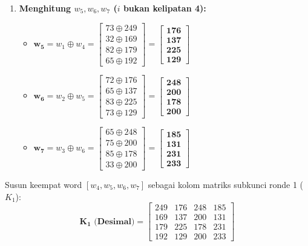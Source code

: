 \documentclass[11pt,a4paper]{article}
\begin{document}
\begin{enumerate}[leftmargin=*]
    \item \textbf{Menghitung $w_5, w_6, w_7$ ($i$ bukan kelipatan 4):}
    \begin{itemize}
        \item $\mathbf{w_5} = w_1 \oplus w_4 = \begin{bmatrix} 73 \oplus 249 \\ 32 \oplus 169 \\ 82 \oplus 179 \\ 65 \oplus 192 \end{bmatrix} = \mathbf{\begin{bmatrix} 176 \\ 137 \\ 225 \\ 129 \end{bmatrix}}$
        \item $\mathbf{w_6} = w_2 \oplus w_5 = \begin{bmatrix} 72 \oplus 176 \\ 65 \oplus 137 \\ 83 \oplus 225 \\ 73 \oplus 129 \end{bmatrix} = \mathbf{\begin{bmatrix} 248 \\ 200 \\ 178 \\ 200 \end{bmatrix}}$
        \item $\mathbf{w_7} = w_3 \oplus w_6 = \begin{bmatrix} 65 \oplus 248 \\ 75 \oplus 200 \\ 85 \oplus 178 \\ 33 \oplus 200 \end{bmatrix} = \mathbf{\begin{bmatrix} 185 \\ 131 \\ 231 \\ 233 \end{bmatrix}}$
    \end{itemize}
\end{enumerate}

Susun keempat word $[w_4, w_5, w_6, w_7]$ sebagai kolom matriks subkunci ronde 1 ($K_1$):
\begin{equation*}
\mathbf{K_1\text{ (Desimal)}} = \begin{bmatrix}
249 & 176 & 248 & 185 \\
169 & 137 & 200 & 131 \\
179 & 225 & 178 & 231 \\
192 & 129 & 200 & 233
\end{bmatrix}
\end{equation*}
\end{document}

